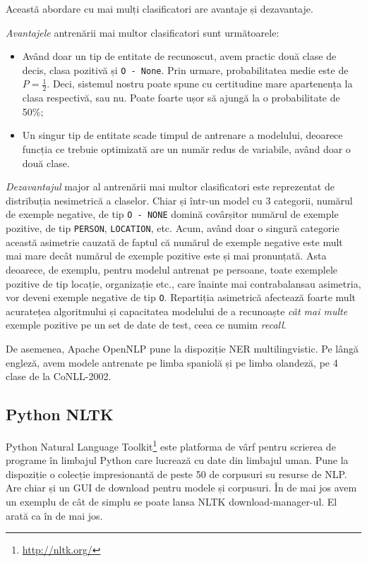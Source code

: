 Această abordare cu mai mulți clasificatori are avantaje și dezavantaje.

\textit{Avantajele} antrenării mai multor clasificatori sunt următoarele:

\begin{itemize}
	\item Având doar un tip de entitate de recunoscut, avem practic două clase de decis, clasa pozitivă și \texttt{O - None}. Prin urmare, probabilitatea medie este de $P = \frac{1}{2} $. Deci, sistemul nostru poate spune cu certitudine mare apartenența la clasa respectivă, sau nu. Poate foarte ușor să ajungă la o probabilitate de 50\%;
	\item Un singur tip de entitate scade timpul de antrenare a modelului, deoarece funcția ce trebuie optimizată are un număr redus de variabile, având doar o două clase.
\end{itemize}

\textit{Dezavantajul} major al antrenării mai multor clasificatori este reprezentat de distribuția nesimetrică a claselor. Chiar și într-un model cu 3 categorii, numărul de exemple negative, de tip \texttt{O - NONE} domină covârșitor numărul de exemple pozitive, de tip \texttt{PERSON}, \texttt{LOCATION}, etc. Acum, având doar o singură categorie această asimetrie cauzată de faptul că numărul de exemple negative este mult mai mare decât numărul de exemple pozitive este și mai pronunțată. Asta deoarece, de exemplu, pentru modelul antrenat pe persoane, toate exemplele pozitive de tip locație, organizație etc., care înainte mai contrabalansau asimetria, vor deveni exemple negative de tip \texttt{O}. Repartiția asimetrică afectează foarte mult acuratețea algoritmului și capacitatea modelului de a recunoaște \textit{cât mai multe} exemple pozitive pe un set de date de test, ceea ce numim \textit{recall}.

De asemenea, Apache OpenNLP pune la dispoziție NER multilingvistic. Pe lângă engleză, avem modele antrenate pe limba spaniolă și pe limba olandeză, pe 4 clase de la CoNLL-2002.

\subsection{Python NLTK}

Python Natural Language Toolkit\footnote{\url{http://nltk.org/}} este platforma de vârf pentru scrierea de programe în limbajul Python care lucrează cu date din limbajul uman. Pune la dispoziție  o colecție impresionantă de peste 50 de corpusuri su resurse de NLP. Are chiar și un GUI de download pentru modele și corpusuri. În  de mai jos avem un exemplu de cât de simplu se poate lansa NLTK download-manager-ul. El arată ca în  de mai jos.

